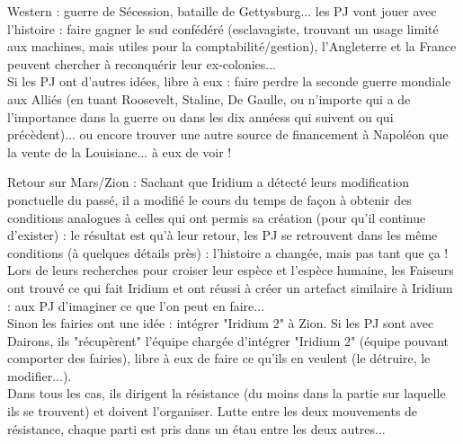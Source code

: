 \documentclass[11pt,twoside,a4paper]{book}
\begin{document}
Western : guerre de S{\'e}cession, bataille de Gettysburg... les PJ vont jouer avec l'histoire : faire gagner le sud conf{\'e}d{\'e}r{\'e} (esclavagiste, trouvant un usage limit{\'e} aux machines, mais utiles pour la comptabilit{\'e}/gestion), l'Angleterre et la France peuvent chercher {\`a} reconqu{\'e}rir leur ex-colonies... ~\\
Si les PJ ont d'autres id{\'e}es, libre {\`a} eux : faire perdre la seconde guerre mondiale aux Alli{\'e}s (en tuant Roosevelt, Staline, De Gaulle, ou n'importe qui a de l'importance dans la guerre ou dans les dix ann{\'e}ess qui suivent ou qui pr{\'e}c{\`e}dent)... ou encore trouver une autre source de financement {\`a} Napol{\'e}on que la vente de la Louisiane... {\`a} eux de voir ! ~\\

\clearpage

Retour sur Mars/Zion : Sachant que Iridium a d{\'e}tect{\'e} leurs modification ponctuelle du pass{\'e}, il a modifi{\'e} le cours du temps de fa\c{c}on {\`a} obtenir des conditions analogues {\`a} celles qui ont permis sa cr{\'e}ation (pour qu'il continue d'exister) : le r{\'e}sultat est qu'{\`a} leur retour, les PJ se retrouvent dans les m{\^e}me conditions ({\`a} quelques d{\'e}tails pr{\`e}s) : l'histoire a chang{\'e}e, mais pas tant que \c{c}a ! ~\\
Lors de leurs recherches pour croiser leur esp{\`e}ce et l'esp{\`e}ce humaine, les Faiseurs ont trouv{\'e} ce qui fait Iridium et ont r{\'e}ussi {\`a} cr{\'e}er un artefact similaire {\`a} Iridium : aux PJ d'imaginer ce que l'on peut en faire... ~\\
Sinon les fairies ont une id{\'e}e : int{\'e}grer "Iridium 2" {\`a} Zion. Si les PJ sont avec Dairons, ils "r{\'e}cup{\`e}rent" l'{\'e}quipe charg{\'e}e d'int{\'e}grer "Iridium 2" ({\'e}quipe pouvant comporter des fairies), libre {\`a} eux de faire ce qu'ils en veulent (le d{\'e}truire, le modifier...). ~\\
Dans tous les cas, ils dirigent la r{\'e}sistance (du moins dans la partie sur laquelle ils se trouvent) et doivent l'organiser. Lutte entre les deux mouvements de r{\'e}sistance, chaque parti est pris dans un {\'e}tau entre les deux autres... ~\\
\end{document}
